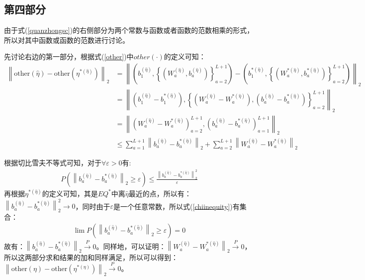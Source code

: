 \documentclass{article}
\begin{document}
\subsection{第四部分}
由于式(\ref*{quanzhongsc})的右侧部分为两个常数与函数或者函数的范数相乘的形式，所以对其中函数或函数的范数进行讨论。
\par 先讨论右边的第一部分，根据式(\ref*{other})中$other(\cdot)$的定义可知：
\begin{equation}\label{2other}
	\begin{split}
		\left\|\text{other}(\hat{\eta})-\text{other}(\eta^{*(\hat{\eta})})\right\|_2&=\left\|(b_1^{(\hat{\eta})},\left\{(W_a^{(\hat{\eta})},b_a^{(\hat{\eta})})\right\}_{a=2}^{L+1})-(b_1^{*(\hat{\eta})},\left\{(W_a^{*(\hat{\eta})},b_a^{*(\hat{\eta})})\right\}_{a=2}^{L+1})\right\|_2\\
		&=\left\|(b_1^{(\hat{\eta})}-b_1^{*(\hat{\eta})}),\left\{(W_a^{(\hat{\eta})}-W_a^{*(\hat{\eta})}),(b_a^{(\hat{\eta})}-b_a^{*(\hat{\eta})})\right\}_{a=2}^{L+1}\right\|_2\\
		&=\left\|(W_a^{(\hat{\eta})}-W_a^{*(\hat{\eta})})_{a=2}^{L+1},(b_a^{(\hat{\eta})}-b_a^{*(\hat{\eta})})_{a=1}^{L+1}\right\|_2\\
		&\leq\sum_{a=1}^{L+1}\left\|b_a^{(\hat{\eta})}-b_a^{*(\hat{\eta})}\right\|_2+\sum_{a=2}^{L+1}\left\|W_a^{(\hat{\eta})}-W_a^{*(\hat{\eta})}\right\|_2
	\end{split}
\end{equation}
\par 根据切比雪夫不等式可知，对于$\forall\varepsilon>0$有:
\begin{equation}\label{chiinequity}
	\begin{split}
		P(\left\|b_a^{(\hat{\eta})}-b_a^{*(\hat{\eta})}\right\|_2\ge\varepsilon)\leq\frac{\left\|b_a^{(\hat{\eta})}-b_a^{*(\hat{\eta})}\right\|_2^2}{\varepsilon}
	\end{split}
\end{equation}
再根据$\eta^{*(\hat{\eta})}$的定义可知，其是$EQ^*$中离$\hat{\eta}$最近的点，所以有：$\left\|b_a^{(\hat{\eta})}-b_a^{*(\hat{\eta})}\right\|_2^2\to 0$，同时由于$\varepsilon$是一个任意常数，所以式(\ref*{chiinequity})有集合：
\begin{equation}
	\begin{split}
		\lim P(\left\|b_a^{(\hat{\eta})}-b_a^{*(\hat{\eta})}\right\|_2\ge\varepsilon)=0
	\end{split}
\end{equation}
故有：$\left\|b_a^{(\hat{\eta})}-b_a^{*(\hat{\eta})}\right\|_2\xrightarrow{P}0$。同样地，可以证明：$\left\|W_a^{(\hat{\eta})}-W_a^{*(\hat{\eta})}\right\|_2\xrightarrow{P}0$，所以这两部分求和结果的加和同样满足，所以可以得到：$\left\|\text{other}(\eta)-\text{other}(\eta^{*(\eta)})\right\|_2\xrightarrow{P}0$。
\end{document}
